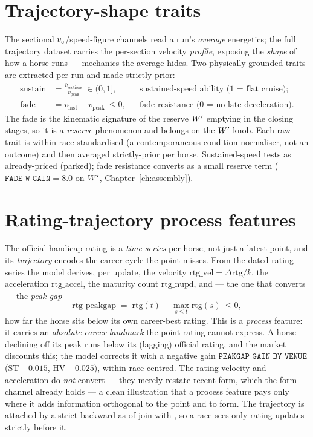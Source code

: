 \section{Trajectory-shape traits}

The sectional ${v_{c}}$/speed-figure channels read a run's \emph{average} energetics; the full
trajectory dataset carries the per-section velocity \emph{profile}, exposing the \emph{shape} of
how a horse runs --- mechanics the average hides. Two physically-grounded traits are extracted per
run and made strictly-prior:
\begin{align}
  \mathrm{sustain} &= \frac{\bar v_{\text{sections}}}{v_{\text{peak}}}\ \in(0,1],
    && \text{sustained-speed ability (1 = flat cruise)};\\
  \mathrm{fade} &= v_{\text{last}} - v_{\text{peak}}\ \le 0,
    && \text{fade resistance (0 = no late deceleration)}.
  \label{eq:trajtraits}
\end{align}
The fade is the kinematic signature of the reserve ${W^{\prime}}$ emptying in the closing stages, so it is
a \emph{reserve} phenomenon and belongs on the ${W^{\prime}}$ knob. Each raw trait is within-race
standardised (a contemporaneous condition normaliser, not an outcome) and then averaged
strictly-prior per horse. Sustained-speed tests as already-priced (parked); fade resistance
converts as a small reserve term ($\texttt{FADE\_W\_GAIN}=8.0$ on ${W^{\prime}}$, Chapter~\ref{ch:assembly}).

\section{Rating-trajectory process features}

The official handicap rating is a \emph{time series} per horse, not just a latest point, and its
\emph{trajectory} encodes the career cycle the point misses. From the dated rating series the model
derives, per update, the velocity $\mathrm{rtg\_vel}=\Delta\mathrm{rtg}/k$, the acceleration
$\mathrm{rtg\_accel}$, the maturity count $\mathrm{rtg\_nupd}$, and --- the one that converts ---
the \emph{peak gap}
\begin{equation}
  \mathrm{rtg\_peakgap} \;=\; \mathrm{rtg}(t) - \max_{s\le t}\mathrm{rtg}(s) \ \le 0,
  \label{eq:peakgap}
\end{equation}
how far the horse sits below its own career-best rating. This is a \emph{process} feature: it
carries an \emph{absolute career landmark} the point rating cannot express. A horse declining off
its peak runs below its (lagging) official rating, and the market discounts this; the model
corrects it with a negative gain $\texttt{PEAKGAP\_GAIN\_BY\_VENUE}$ (ST $-0.015$, HV $-0.025$),
within-race centred. The rating velocity and acceleration do \emph{not} convert --- they merely
restate recent form, which the form channel already holds --- a clean illustration that a process
feature pays only where it adds information orthogonal to the point and to form. The trajectory is
attached by a strict backward as-of join with , so a race sees
only rating updates strictly before it.

